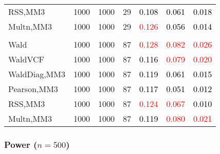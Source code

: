 \documentclass[
]{article}
\begin{document}
\begin{table}[H]
{\begin{tabular}[t]{lrrrrrr}
\hspace{1em}RSS,MM3 & 1000 & 1000 & 29 & \textcolor{black}{0.108} & \textcolor{black}{0.061} & \textcolor{black}{0.018}\\
\hspace{1em}Multn,MM3 & 1000 & 1000 & 29 & \textcolor{red}{0.126} & \textcolor{black}{0.056} & \textcolor{black}{0.014}\\
\addlinespace[0.3em]
\multicolumn{7}{l}{\textbf{3F 15V}}\\
\hspace{1em}Wald & 1000 & 1000 & 87 & \textcolor{red}{0.128} & \textcolor{red}{0.082} & \textcolor{red}{0.026}\\
\hspace{1em}WaldVCF & 1000 & 1000 & 87 & \textcolor{black}{0.116} & \textcolor{red}{0.079} & \textcolor{red}{0.020}\\
\hspace{1em}WaldDiag,MM3 & 1000 & 1000 & 87 & \textcolor{black}{0.119} & \textcolor{black}{0.061} & \textcolor{black}{0.015}\\
\hspace{1em}Pearson,MM3 & 1000 & 1000 & 87 & \textcolor{black}{0.117} & \textcolor{black}{0.051} & \textcolor{black}{0.012}\\
\hspace{1em}RSS,MM3 & 1000 & 1000 & 87 & \textcolor{red}{0.124} & \textcolor{red}{0.067} & \textcolor{black}{0.010}\\
\hspace{1em}Multn,MM3 & 1000 & 1000 & 87 & \textcolor{black}{0.119} & \textcolor{red}{0.080} & \textcolor{red}{0.021}\\
\bottomrule
\end{tabular}}
\endgroup{}
\end{table}

\hypertarget{power-n500-2}{%
\subsubsection{\texorpdfstring{Power
(\(n=500\))}{Power (n=500)}}\label{power-n500-2}}
\end{document}
